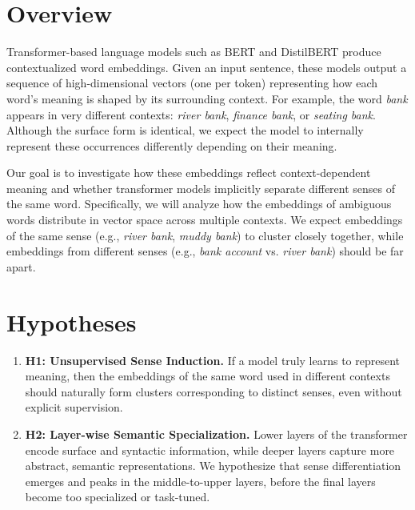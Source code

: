 \documentclass{template}
\begin{document}
\section*{Overview}
Transformer-based language models such as BERT and DistilBERT produce contextualized word embeddings. Given an input sentence, these models output a sequence of high-dimensional vectors (one per token) representing how each word's meaning is shaped by its surrounding context. For example, the word \textit{bank} appears in very different contexts: \textit{river bank}, \textit{finance bank}, or \textit{seating bank}. Although the surface form is identical, we expect the model to internally represent these occurrences differently depending on their meaning.

Our goal is to investigate how these embeddings reflect context-dependent meaning and whether transformer models implicitly separate different senses of the same word. Specifically, we will analyze how the embeddings of ambiguous words distribute in vector space across multiple contexts. We expect embeddings of the same sense (e.g., \textit{river bank}, \textit{muddy bank}) to cluster closely together, while embeddings from different senses (e.g., \textit{bank account} vs. \textit{river bank}) should be far apart.

\section*{Hypotheses}
\begin{enumerate}
    \item \textbf{H1: Unsupervised Sense Induction.} If a model truly learns to represent meaning, then the embeddings of the same word used in different contexts should naturally form clusters corresponding to distinct senses, even without explicit supervision.
    \item \textbf{H2: Layer-wise Semantic Specialization.} Lower layers of the transformer encode surface and syntactic information, while deeper layers capture more abstract, semantic representations. We hypothesize that sense differentiation emerges and peaks in the middle-to-upper layers, before the final layers become too specialized or task-tuned.
\end{enumerate}

\end{document}
